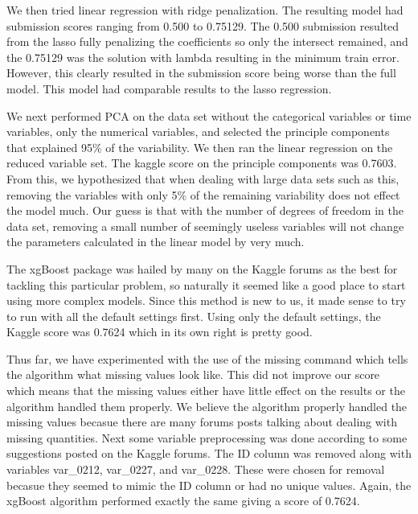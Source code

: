 \documentclass[aps, reprint, groupedaddress, superscriptaddress, amsmath, 10pt]{revtex4-1}
\begin{document}
	We then tried linear regression with ridge penalization.  The resulting model had submission scores ranging from 0.500 to 0.75129.  The 0.500 submission resulted from the lasso fully penalizing the coefficients so only the intersect remained, and the 0.75129 was the solution with lambda resulting in the minimum train error.  However, this clearly resulted in the submission score being worse than the full model.  This model had comparable results to the lasso regression. 
	
	We next performed PCA on the data set without the categorical variables or time variables, only the numerical variables, and selected the principle components that explained 95$\%$ of the variability.  We then ran the linear regression on the reduced variable set.  The kaggle score on the principle components was 0.7603.  From this, we hypothesized that when dealing with large data sets such as this, removing the variables with only 5$\%$ of the remaining variability does not effect the model much.  Our guess is that with the number of degrees of freedom in the data set, removing a small number of seemingly useless variables will not change the parameters calculated in the linear model by very much.
	
	The xgBoost package was hailed by many on the Kaggle forums as the best for tackling this particular problem, so naturally it seemed like a good place to start using more complex models.  Since this method is new to us, it made sense to try to run with all the default settings first.  Using only the default settings, the Kaggle score was 0.7624 which in its own right is pretty good.  
		
	Thus far, we have experimented with the use of the missing command which tells the algorithm what missing values look like.  This did not improve our score which means that the missing values either have little effect on the results or the algorithm handled them properly.  We believe the algorithm properly handled the missing values becasue there are many forums posts talking about dealing with missing quantities.  Next some variable preprocessing was done according to some suggestions posted on the Kaggle forums.  The ID column was removed along with variables var\_0212, var\_0227, and var\_0228. These were chosen for removal becasue they seemed to mimic the ID column or had no unique values. Again, the xgBoost algorithm performed exactly the same giving a score of 0.7624. 
	
\end{document}
